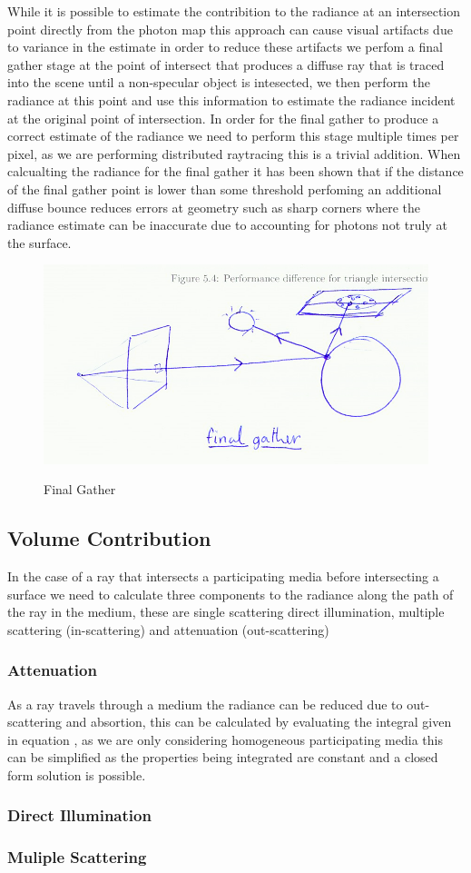 While it is possible to estimate the contribition to the radiance at an intersection point directly from the photon map this
approach can cause visual artifacts due to variance in the estimate in order to reduce these artifacts we perfom a final gather
stage at the point of intersect that produces a diffuse ray that is traced into the scene until a non-specular object is intesected,
we then perform the radiance at this point and use this information to estimate the radiance incident at the original point of intersection.
In order for the final gather to produce a correct estimate of the radiance we need to perform this stage multiple times per pixel, as we
are performing distributed raytracing this is a trivial addition. When calcualting the radiance for the final gather it has been shown 
that if the distance of the final gather point is lower than some threshold perfoming an additional diffuse bounce reduces errors at geometry
such as sharp corners where the radiance estimate can be inaccurate due to accounting for photons not truly at the surface.

\begin{figure}
\centering
\includegraphics[width=\textwidth]{./images/final_gather.png}
\label{fig:final_gather}
\caption{Final Gather}
\end{figure}

\subsection{Volume Contribution}
In the case of a ray that intersects a participating media before intersecting a surface we need to calculate three components to
the radiance along the path of the ray in the medium, these are single scattering direct illumination, multiple scattering (in-scattering)
and attenuation (out-scattering)

\subsubsection{Attenuation}
As a ray travels through a medium the radiance can be reduced due to out-scattering and absortion, this can be calculated by evaluating
the integral given in equation , as we are only considering homogeneous participating media this can be
simplified as the properties being integrated are constant and a closed form solution is possible.


\subsubsection{Direct Illumination}
\subsubsection{Muliple Scattering}

